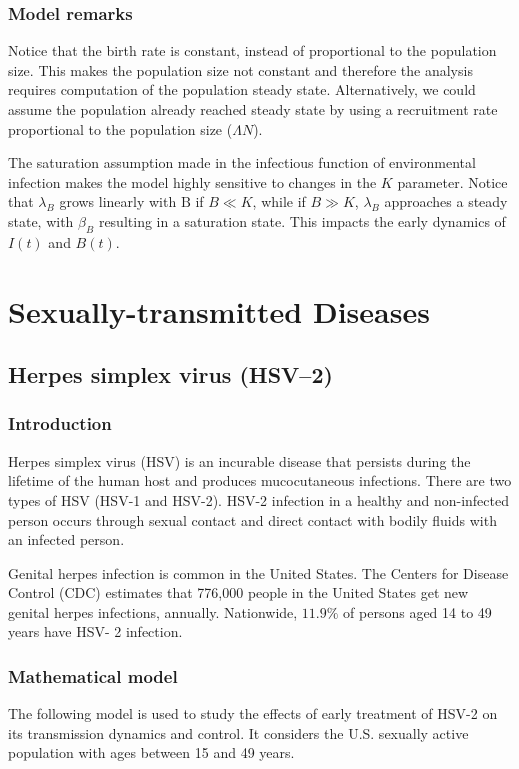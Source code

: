 \documentclass{book}\usepackage[]{graphicx}\usepackage[]{color}
\begin{document}
\subsection*{Model remarks}
Notice that the birth rate is constant, instead of proportional to the population size. This makes the population size not constant and therefore the analysis requires computation of the population steady state. Alternatively, we could assume the population already reached steady state by using a recruitment rate proportional to the population size ($\Lambda N$).

The saturation assumption made in the infectious function of environmental infection makes the model highly sensitive to changes in the $K$ parameter.
Notice that $\lambda_{B}$ grows linearly with $\mathrm{B}$ if $B \ll K$, while if $B \gg K$, $\lambda_{B}$ approaches a steady state, with $\beta_{B}$ resulting in a saturation state.
This impacts the early dynamics of $I(t)$ and $B(t)$.


\chapter{Sexually-transmitted Diseases}
\label{chapt:sextrans}

\section{Herpes simplex virus (HSV–2)}
\subsection*{Introduction}
Herpes simplex virus (HSV) is an incurable disease that persists during the lifetime of the human host and produces mucocutaneous infections. There are two types of HSV (HSV-1 and HSV-2). HSV-2 infection in a healthy and non-infected person occurs through sexual contact and direct contact with bodily fluids with an infected person.

Genital herpes infection is common in the United States. The Centers for Disease Control (CDC) estimates that 776,000 people in the United States get new genital herpes infections, annually. Nationwide, $11.9 \%$ of persons aged 14 to 49 years have HSV- 2 infection. 

\subsection*{Mathematical model}
The following model \cite{almonte2020cost} is used to study the effects of early treatment of HSV-2 on its transmission dynamics and control. It considers the U.S. sexually active population with ages between 15 and 49 years.
%
\end{document}
